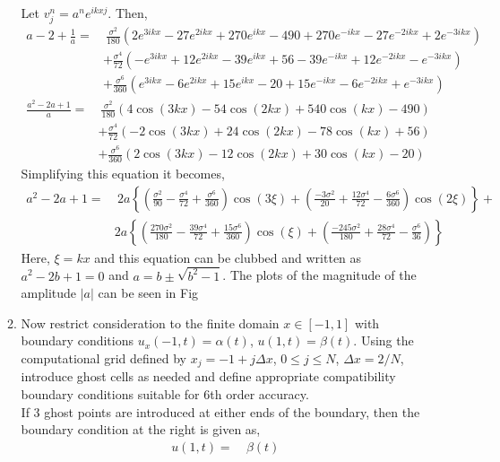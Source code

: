 \documentclass[11pt]{article}
\newcommand{\vnd}[1]{v^{n}_{#1}}
\newcommand{\bra}[1]{\left(#1\right)}
\begin{document}
\begin{enumerate}
\begin{enumerate}
      Let $\vnd{j} = a^n e^{ikxj}$. Then, 
      \begin{align*}
          a-2+\frac{1}{a}=& \ \frac{\sigma^2}{180}\bra{2e^{3ikx}-27e^{2ikx}+270e^{ikx}-490+270e^{-ikx}-27e^{-2ikx}+2e^{-3ikx}}\\
          & + \frac{\sigma^4}{72} \bra{-e^{3ikx}+12e^{2ikx}-39e^{ikx}+56-39e^{-ikx}+12e^{-2ikx}-e^{-3ikx}} \\
          & + \frac{\sigma^6}{360}\bra{e^{3ikx}-6e^{2ikx}+15e^{ikx}-20+15e^{-ikx}-6e^{-2ikx}+e^{-3ikx}}
      \end{align*}
      \begin{align*}
          \frac{a^2-2a+1}{a} =& \ \frac{\sigma^2}{180}\bra{4\cos{\bra{3kx}} -54\cos{(2kx)}+ 540\cos{(kx)}-490} \\
          & + \frac{\sigma^4}{72}\bra{-2\cos{(3kx)}+24\cos{(2kx)}-78\cos{(kx)}+56} \\
          & + \frac{\sigma^6}{360}\bra{2\cos{(3kx)}-12\cos{(2kx)}+30\cos{(kx)}-20}
      \end{align*}
      Simplifying this equation it becomes,
      \begin{align*}
          a^2-2a+1 =& \ 2a \left\{\bra{\frac{\sigma^2}{90}-\frac{\sigma^4}{72}+\frac{\sigma^6}{360}}\cos{(3\xi)} + \bra{\frac{-3\sigma^2}{20} + \frac{12\sigma^4}{72}-\frac{6\sigma^6}{360}}\cos{(2\xi)}\right\}+ \\ 
          & 2a\left\{ \bra{\frac{270\sigma^2}{180}-\frac{39\sigma^4}{72}+\frac{15\sigma^6}{360}}\cos{(\xi)}+ \bra{\frac{-245\sigma^2}{180}+\frac{28\sigma^4}{72}-\frac{\sigma^6}{36}}\right\}
      \end{align*}
      Here, $\xi = kx$ and this equation can be clubbed and written as $a^2-2b+1=0$ and $a=b\pm \sqrt{b^2-1}$. The plots of the magnitude of the amplitude $|a|$ can be seen in Fig~
      \item {\color{blue} Now restrict consideration to the finite domain $x\in[-1,1]$ with boundary conditions $u_x(-1,t) = \alpha(t)$, $u(1,t) = \beta(t)$. Using the computational grid defined by $x_j=-1+j\Delta x$, $0 \le j \le N$, $\Delta x=2/N$, introduce ghost cells as needed and define appropriate compatibility boundary conditions suitable for 6th order accuracy. }\\
      If 3 ghost points are introduced at either ends of the boundary, then the boundary condition at the right is given as,
      \begin{align*}
          u(1,t) =& \ \beta(t) \\

\end{align*}
\end{enumerate}
\end{enumerate}
\end{document}
